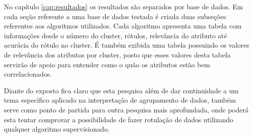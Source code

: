 
No capítulo \ref{cap:resultados} os resultados são separados por base de dados. Em cada seção referente a uma base de dados testada é criada duas subseções referentes aos algoritmos utilizados. Cada algoritmo apresenta uma tabela com informações desde o número do cluster, rótulos, relevância do atributo até acurácia do rótulo no cluster. É também exibida uma tabela possuindo os valores de relevância dos atributos por cluster, posto que esses valores desta tabela servirão de apoio para entender como o quão os atributos estão bem correlacionados.


Diante do exposto fica claro que esta pesquisa além de dar continuidade a um tema específico aplicado na interpretação de agrupamento de dados, também serve como ponto de partida para outra pesquisa mais aprofundada, onde poderá esta tentar comprovar a possibilidade de fazer rotulação de dados utilizando qualquer algoritmo supervisionado.




